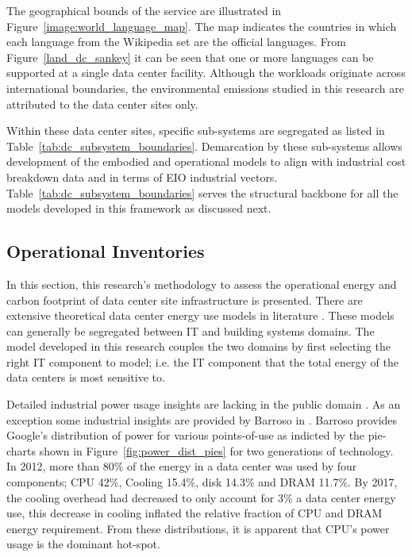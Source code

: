     
    
    The geographical bounds of the service are illustrated in Figure~\ref{image:world_language_map}. The map indicates the countries in which each language from the Wikipedia set are the official languages. From  Figure~\ref{land_dc_sankey} it can be seen that one or more languages can be supported at a single data center facility. Although the workloads originate across international boundaries, the environmental emissions studied in this research are attributed to the data center sites only.  
    
    
    
    Within these data center sites, specific sub-systems are segregated as listed in Table~\ref{tab:dc_subsystem_boundaries}. Demarcation by these sub-systems allows development of the embodied and operational models to align with industrial cost breakdown data and in terms of EIO industrial vectors. Table~\ref{tab:dc_subsystem_boundaries} serves the structural backbone for all the models developed in this framework as discussed next.
    
    
    
    \subsection{Operational Inventories}
    
    
    In this section, this research's methodology to assess the operational energy and carbon footprint of data center site infrastructure is presented. There are extensive theoretical data center energy use models in literature \cite{dayarathna16, joshi12}. These models can generally be segregated between IT and building systems domains. The model developed in this research couples the two domains by first selecting the right IT component to model; i.e. the IT component that the total energy of the data centers is most sensitive to.
    
    Detailed industrial power usage insights are lacking in the public domain \cite{Masanet20}. As an exception some industrial insights are provided by Barroso in \cite{barroso18, barroso13}. Barroso provides Google's distribution of power for various points-of-use as indicted by the pie-charts shown in Figure~\ref{fig:power_dist_pies} for two generations of technology. In 2012, more than 80\% of the energy in a data center was used by four components; CPU 42\%, Cooling 15.4\%, disk 14.3\% and DRAM 11.7\%. By 2017, the cooling overhead had decreased to only account for 3\% a data center energy use, this decrease in cooling inflated the relative fraction of CPU and DRAM energy requirement. From these distributions, it is apparent that CPU's power usage is the dominant hot-spot.  
    
